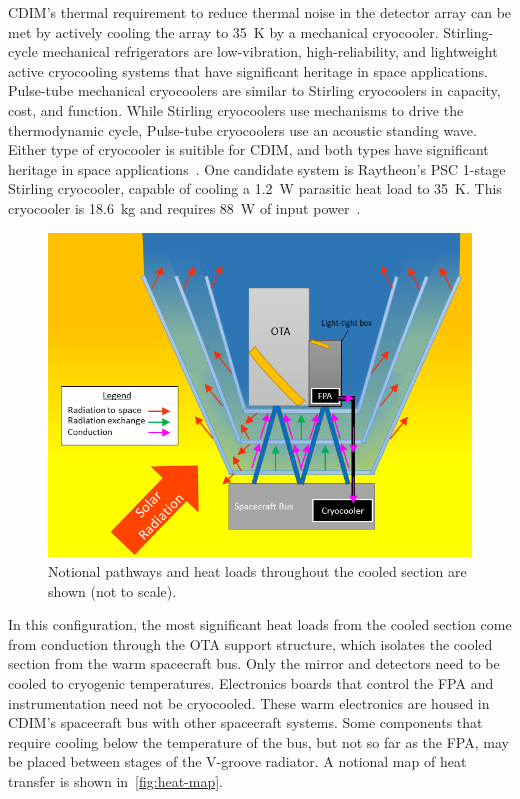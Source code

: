 \documentclass{ws-jai}
\begin{document}
CDIM's thermal requirement to reduce thermal noise in the detector array can be met by actively cooling the array to \SI{35}{\kelvin} by a mechanical cryocooler.
Stirling-cycle mechanical refrigerators are low-vibration, high-reliability, and lightweight active cryocooling systems that have significant heritage in space applications.
Pulse-tube mechanical cryocoolers are similar to Stirling cryocoolers in capacity, cost, and function.
While Stirling cryocoolers use mechanisms to drive the thermodynamic cycle, Pulse-tube cryocoolers use an acoustic standing wave.
Either type of cryocooler is suitible for CDIM, and both types have significant heritage in space applications~\cite{gilmore2003spacecraft}.
One candidate system is Raytheon's PSC 1-stage Stirling cryocooler, capable of cooling a \SI{1.2}{\watt} parasitic heat load to \SI{35}{\kelvin}.
This cryocooler is \SI{18.6}{\kilo\gram} and requires \SI{88}{\watt} of input power~\cite{ross2005cryocoolers}.

\begin{figure}[!ht]
  \centering
  \includegraphics[width=.7\linewidth]{figs/heat-map.png}
  \caption{Notional pathways and heat loads throughout the cooled section are shown (not to scale).
\label{fig:heat-map}
}
\end{figure}

In this configuration, the most significant heat loads from the cooled section come from conduction through the OTA support structure, which isolates the cooled section from the warm spacecraft bus.
Only the mirror and detectors need to be cooled to cryogenic temperatures.
Electronics boards that control the FPA and instrumentation need not be cryocooled.
These warm electronics are housed in CDIM's spacecraft bus with other spacecraft systems.
Some components that require cooling below the temperature of the bus, but not so far as the FPA, may be placed between stages of the V-groove radiator.
A notional map of heat transfer is shown in~\autoref{fig:heat-map}.
\end{document}
